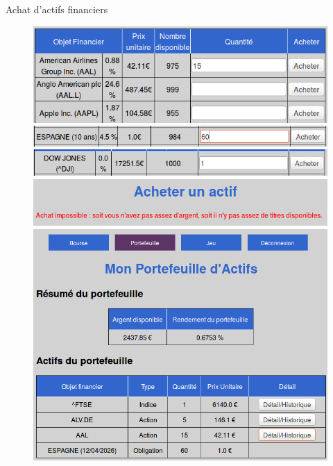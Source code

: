       Achat d'actifs financiers
      \begin{figure}[H]
	\center
	\includegraphics[scale=0.5]{../graph/7-achataction.png}
	\includegraphics[scale=0.5]{../graph/7-achatobligation.png}
	\includegraphics[scale=0.5]{../graph/7-achatindicetropcher.png}
	\includegraphics[scale=0.5]{../graph/7-achatindiceechec.png}
	\includegraphics[scale=0.5]{../graph/7-vueportefeuilleapresachats.png}
      \end{figure}
      
